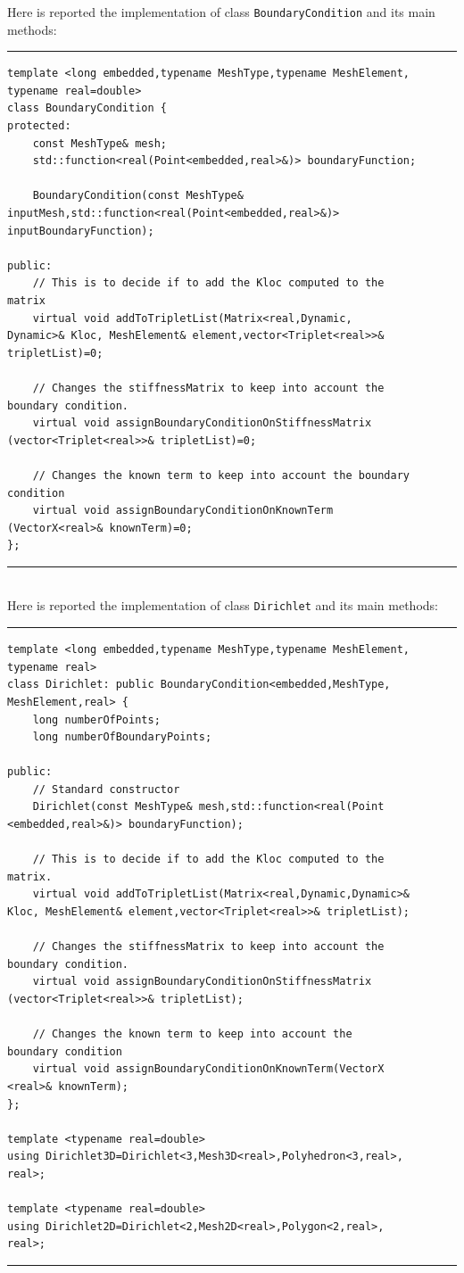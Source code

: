 Here is reported the implementation of class \verb|BoundaryCondition| and its main methods:

\noindent\rule{12.7cm}{1pt}
\begin{verbatim}
template <long embedded,typename MeshType,typename MeshElement,
typename real=double>
class BoundaryCondition {
protected:
    const MeshType& mesh;
    std::function<real(Point<embedded,real>&)> boundaryFunction;

    BoundaryCondition(const MeshType&
inputMesh,std::function<real(Point<embedded,real>&)> 
inputBoundaryFunction);

public:
    // This is to decide if to add the Kloc computed to the 
matrix
    virtual void addToTripletList(Matrix<real,Dynamic,
Dynamic>& Kloc, MeshElement& element,vector<Triplet<real>>& 
tripletList)=0;
	
    // Changes the stiffnessMatrix to keep into account the 
boundary condition.
    virtual void assignBoundaryConditionOnStiffnessMatrix
(vector<Triplet<real>>& tripletList)=0;
	
    // Changes the known term to keep into account the boundary
condition
    virtual void assignBoundaryConditionOnKnownTerm
(VectorX<real>& knownTerm)=0; 		
};

\end{verbatim}

\noindent\rule{12.7cm}{1pt}\\

Here is reported the implementation of class \verb|Dirichlet| and its main methods:

\noindent\rule{12.7cm}{1pt}
\begin{verbatim}
template <long embedded,typename MeshType,typename MeshElement,
typename real>
class Dirichlet: public BoundaryCondition<embedded,MeshType,
MeshElement,real> {
    long numberOfPoints;
    long numberOfBoundaryPoints;

public:
    // Standard constructor
    Dirichlet(const MeshType& mesh,std::function<real(Point
<embedded,real>&)> boundaryFunction);
	
    // This is to decide if to add the Kloc computed to the 
matrix.
    virtual void addToTripletList(Matrix<real,Dynamic,Dynamic>& 
Kloc, MeshElement& element,vector<Triplet<real>>& tripletList);
	
    // Changes the stiffnessMatrix to keep into account the 
boundary condition.
    virtual void assignBoundaryConditionOnStiffnessMatrix
(vector<Triplet<real>>& tripletList);
	
    // Changes the known term to keep into account the 
boundary condition
    virtual void assignBoundaryConditionOnKnownTerm(VectorX
<real>& knownTerm);	
};

template <typename real=double>
using Dirichlet3D=Dirichlet<3,Mesh3D<real>,Polyhedron<3,real>,
real>;

template <typename real=double>
using Dirichlet2D=Dirichlet<2,Mesh2D<real>,Polygon<2,real>,
real>;
\end{verbatim}
\noindent\rule{12.7cm}{1pt}\\

